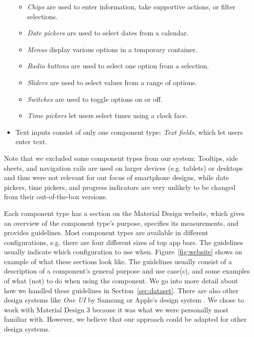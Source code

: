 \documentclass[11pt,titlepage,oneside,openany]{book}
\begin{document}
\begin{itemize}
\begin{itemize}
		\item \emph{Chips} are used to enter information, take supportive actions, or filter selections.
		\item \emph{Date pickers} are used to select dates from a calendar.
		\item \emph{Menus} display various options in a temporary container.
		\item \emph{Radio buttons} are used to select one option from a selection.
		\item \emph{Sliders} are used to select values from a range of options.
		\item \emph{Switches} are used to toggle options on or off.
		\item \emph{Time pickers} let users select times using a clock face.
	\end{itemize}
	\item Text inputs consist of only one component type: \emph{Text fields}, which let users enter text.
\end{itemize}

Note that we excluded some component types from our system: Tooltips, side sheets, and navigation rails are used on larger devices (e.g. tablets) or desktops and thus were not relevant for our focus of smartphone designs, while date pickers, time pickers, and progress indicators are very unlikely to be changed from their out-of-the-box versions. 

Each component type has a section on the Material Design website, which gives an overview of the component type's purpose, specifies its measurements, and provides guidelines. Most component types are available in different configurations, e.g. there are four different sizes of top app bars. The guidelines usually indicate which configuration to use when. Figure~\ref{fig:website} shows an example of what these sections look like. The guidelines usually consist of a description of a component's general purpose and use case(s), and some examples of what (not) to do when using the component. We go into more detail about how we handled these guidelines in Section~\ref{sec:dataset}. There are also other design systems like \emph{One UI} \cite{noauthor_one_nodate} by Samsung or Apple's design system \cite{inc_design_nodate}. We chose to work with Material Design 3 because it was what we were personally most familiar with. However, we believe that our approach could be adapted for other design systems.
\end{document}
